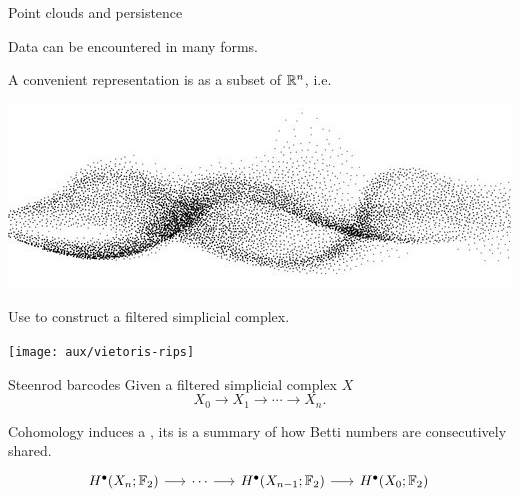 \begin{frame}{Point clouds and persistence}
	\pause

	Data can be encountered in many forms.

	\smallskip\pause
	A convenient representation is as a subset of $\mathbb{R}^n$, i.e. 

	\begin{center}
		\includegraphics[scale=.4]{aux/point_cloud_cropped}
	\end{center}

	\medskip\pause
	Use  to construct a filtered simplicial complex.

	\medskip
	\begin{center}
		\texttt{[image: aux/vietoris-rips]}
	\end{center}
\end{frame}

\begin{frame}[fragile]{Steenrod barcodes}
	\pause
	Given a filtered simplicial complex $X$
	\[
	X_0 \to X_1 \to \cdots \to X_n.
	\]

	\pause
	Cohomology induces a , its  is a summary of how Betti numbers are consecutively shared.\\

	\smallskip
	\phantom{A cohomology operation induces an endomorphism}
	\[
	\begin{tikzcd}[column sep = 15]
		H^\bullet(X_n; \Ftwo) \arrow[r] & \cdots \arrow[r] & H^\bullet(X_{n-1}; \Ftwo) \arrow[r] & H^\bullet(X_0; \Ftwo) \\
		\phantom{H^\bullet(X_n; \Ftwo)} \arrow[u, "\phantom{\Sq^k}", phantom] & \phantom{\cdots} & \phantom{H^\bullet(X_{n-1}; \Ftwo)} & \phantom{H^\bullet(X_0; \Ftwo)} \arrow[u, "\phantom{\Sq^k}", phantom] \phantom{.}
	\end{tikzcd}
	\]
\end{frame}

